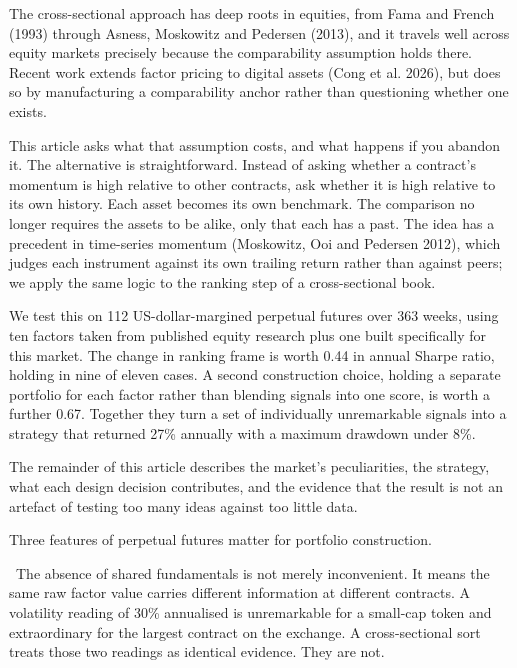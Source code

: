 \documentclass[12pt]{article}
\makeatletter
\renewcommand{\section}[1]{\par\vspace{16pt}%
  \noindent{\bfseries\MakeUppercase{#1}}\par\nobreak\vspace{4pt}%
  \@afterindenttrue\@afterheading}
\newcommand{\runin}[1]{\par\vspace{2pt}\noindent\hspace*{0.5in}{\bfseries #1}\ \ignorespaces}
\makeatother
\begin{document}
The cross-sectional approach has deep roots in equities, from Fama and French
(1993) through Asness, Moskowitz and Pedersen (2013), and it travels well across
equity markets precisely because the comparability assumption holds there. Recent
work extends factor pricing to digital assets (Cong et al. 2026), but does so by
manufacturing a comparability anchor rather than questioning whether one exists.

This article asks what that assumption costs, and what happens if you abandon it.
The alternative is straightforward. Instead of asking whether a contract's
momentum is high relative to other contracts, ask whether it is high relative to
its own history. Each asset becomes its own benchmark. The comparison no longer
requires the assets to be alike, only that each has a past. The idea has a
precedent in time-series momentum (Moskowitz, Ooi and Pedersen 2012), which
judges each instrument against its own trailing return rather than against peers;
we apply the same logic to the ranking step of a cross-sectional book.

We test this on 112 US-dollar-margined perpetual futures over 363 weeks, using
ten factors taken from published equity research plus one built specifically for
this market. The change in ranking frame is worth 0.44 in annual Sharpe ratio,
holding in nine of eleven cases. A second construction choice, holding a separate
portfolio for each factor rather than blending signals into one score, is worth a
further 0.67. Together they turn a set of individually unremarkable signals into a
strategy that returned 27\% annually with a maximum drawdown under 8\%.

The remainder of this article describes the market's peculiarities, the strategy,
what each design decision contributes, and the evidence that the result is not an
artefact of testing too many ideas against too little data.

\section{Why This Market Is Different}

Three features of perpetual futures matter for portfolio construction.

\runin{No anchor for comparison.}The absence of shared fundamentals is not merely inconvenient. It means the same
raw factor value carries different information at different contracts. A
volatility reading of 30\% annualised is unremarkable for a small-cap token and
extraordinary for the largest contract on the exchange. A cross-sectional sort
treats those two readings as identical evidence. They are not.
\end{document}
